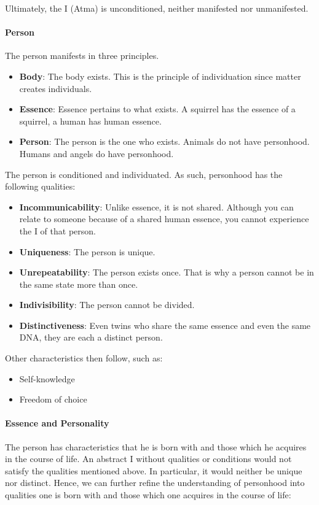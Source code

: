 Ultimately, the I (Atma) is unconditioned, neither manifested nor unmanifested.

\paragraph{Person}
The person manifests in three principles.

\begin{itemize}
\item \textbf{Body}: The body exists. This is the principle of individuation since matter creates individuals. 
\item \textbf{Essence}: Essence pertains to what exists. A squirrel has the essence of a squirrel, a human has human essence. 
\item \textbf{Person}: The person is the one who exists. Animals do not have personhood. Humans and angels do have personhood. 
\end{itemize}
The person is conditioned and individuated. As such, personhood has the following qualities:

\begin{itemize}
\item \textbf{Incommunicability}: Unlike essence, it is not shared. Although you can relate to someone because of a shared human essence, you cannot experience the I of that person. 
\item \textbf{Uniqueness}: The person is unique. 
\item \textbf{Unrepeatability}: The person exists once. That is why a person cannot be in the same state more than once. 
\item \textbf{Indivisibility}: The person cannot be divided. 
\item \textbf{Distinctiveness}: Even twins who share the same essence and even the same DNA, they are each a distinct person. 
\end{itemize}
Other characteristics then follow, such as:

\begin{itemize}
\item Self-knowledge 
\item Freedom of choice 
\end{itemize}
\paragraph{Essence and Personality}
The person has characteristics that he is born with and those which he acquires in the course of life. An abstract I without qualities or conditions would not satisfy the qualities mentioned above. In particular, it would neither be unique nor distinct. Hence, we can further refine the understanding of personhood into qualities one is born with and those which one acquires in the course of life:


